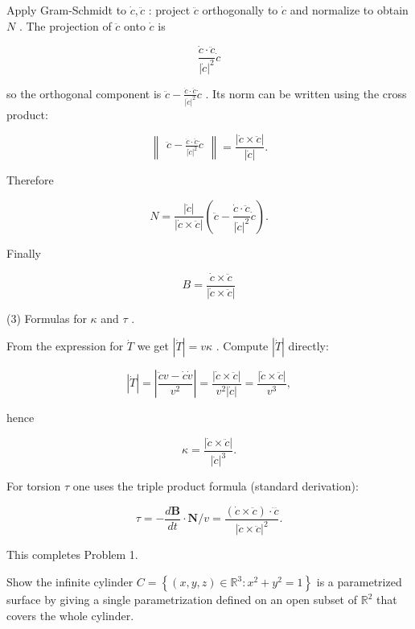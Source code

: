 \documentclass[10pt]{article}
\begin{document}
Apply Gram-Schmidt to \(\dot{c},\ddot{c}\) : project \(\ddot{c}\) orthogonally to \(\dot{c}\) and normalize to obtain \(N\) . The projection of \(\ddot{c}\) onto \(\dot{c}\) is

\[
\frac{\dot{c} \cdot  \ddot{c}}{{\left| \dot{c}\right| }^{2}}\dot{c}
\]

so the orthogonal component is \(\ddot{c} - \frac{\dot{c} \cdot  \ddot{c}}{{\left| \dot{c}\right| }^{2}}\dot{c}\) . Its norm can be written using the cross product:

\[
\begin{Vmatrix}{\ddot{c} - \frac{\dot{c} \cdot  \ddot{c}}{{\left| \dot{c}\right| }^{2}}\dot{c}}\end{Vmatrix} = \frac{\left| \dot{c} \times  \ddot{c}\right| }{\left| \dot{c}\right| }.
\]

Therefore

\[
N = \frac{\left| \dot{c}\right| }{\left| \dot{c} \times  \ddot{c}\right| }\left( {\ddot{c} - \frac{\dot{c} \cdot  \ddot{c}}{{\left| \dot{c}\right| }^{2}}\dot{c}}\right) .
\]

Finally

\[
B = \frac{\dot{c} \times  \ddot{c}}{\left| \dot{c} \times  \ddot{c}\right| }
\]

(3) Formulas for \(\kappa\) and \(\tau\) .

From the expression for \(\dot{T}\) we get \(\left| \dot{T}\right|  = {v\kappa }\) . Compute \(\left| \dot{T}\right|\) directly:

\[
\left| \dot{T}\right|  = \left| \frac{\ddot{c}v - \dot{c}\dot{v}}{{v}^{2}}\right|  = \frac{\left| \dot{c} \times  \ddot{c}\right| }{{v}^{2}\left| \dot{c}\right| } = \frac{\left| \dot{c} \times  \ddot{c}\right| }{{v}^{3}},
\]

hence

\[
\kappa  = \frac{\left| \dot{c} \times  \ddot{c}\right| }{{\left| \dot{c}\right| }^{3}}.
\]

For torsion \(\tau\) one uses the triple product formula (standard derivation):

\[
\tau  =  - \frac{d\mathbf{B}}{dt} \cdot  \mathbf{N}/v = \frac{\left( {\dot{c} \times  \ddot{c}}\right)  \cdot  \dddot{c}}{{\left| \dot{c} \times  \ddot{c}\right| }^{2}}.
\]

This completes Problem 1.

\begin{problem}[title=PROBLEM 2 (4 POINTS)]
Show the infinite cylinder \(C = \left\{  {\left( {x,y,z}\right)  \in  {\mathbb{R}}^{3} : {x}^{2} + {y}^{2} = 1}\right\}\) is a parametrized surface by giving a single parametrization defined on an open subset of \({\mathbb{R}}^{2}\) that covers the whole cylinder.
\end{problem}
\end{document}
